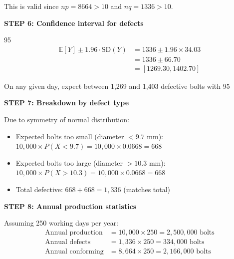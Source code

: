 \documentclass[12pt]{article}
\begin{document}
\begin{solution}
This is valid since $np = 8664 > 10$ and $nq = 1336 > 10$.

\textbf{STEP 6: Confidence interval for defects}

95%
\begin{align*}
\mathbb{E}[Y] \pm 1.96 \cdot \text{SD}(Y) &= 1336 \pm 1.96 \times 34.03 \\
&= 1336 \pm 66.70 \\
&= [1269.30, 1402.70]
\end{align*}

On any given day, expect between 1,269 and 1,403 defective bolts with 95%

\textbf{STEP 7: Breakdown by defect type}

Due to symmetry of normal distribution:
\begin{itemize}
    \item Expected bolts too small (diameter $< 9.7$ mm): $10,000 \times P(X < 9.7) = 10,000 \times 0.0668 = 668$
    \item Expected bolts too large (diameter $> 10.3$ mm): $10,000 \times P(X > 10.3) = 10,000 \times 0.0668 = 668$
    \item Total defective: $668 + 668 = 1,336$ (matches total)
\end{itemize}

\textbf{STEP 8: Annual production statistics}

Assuming 250 working days per year:
\begin{align*}
\text{Annual production} &= 10,000 \times 250 = 2,500,000 \text{ bolts} \\
\text{Annual defects} &= 1,336 \times 250 = 334,000 \text{ bolts} \\
\text{Annual conforming} &= 8,664 \times 250 = 2,166,000 \text{ bolts}
\end{align*}

\end{solution}
\end{document}

